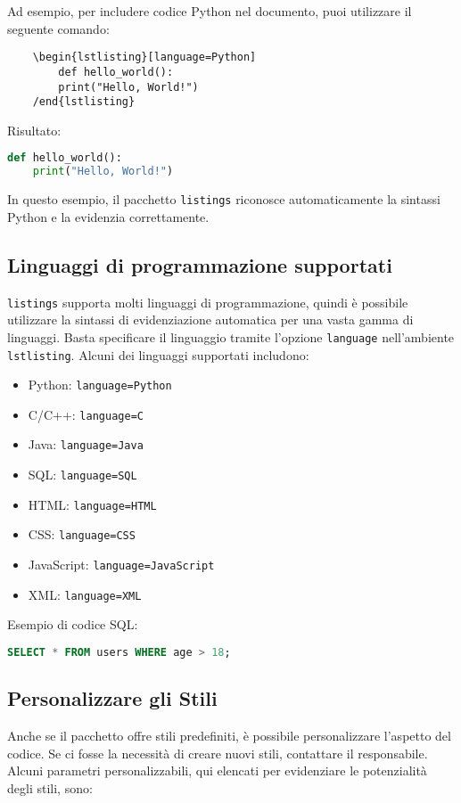 Ad esempio, per includere codice Python nel documento, puoi utilizzare il seguente comando:

\begin{lstlisting}
	\begin{lstlisting}[language=Python]
		def hello_world():
		print("Hello, World!")
	/end{lstlisting}
\end{lstlisting}

Risultato: 
\begin{lstlisting}[language=Python]
	def hello_world():
	print("Hello, World!")
\end{lstlisting}

In questo esempio, il pacchetto \texttt{listings} riconosce automaticamente la sintassi Python e la evidenzia correttamente.

\subsection{Linguaggi di programmazione supportati}
\texttt{listings} supporta molti linguaggi di programmazione, quindi è possibile utilizzare la sintassi di evidenziazione automatica per una vasta gamma di linguaggi. Basta specificare il linguaggio tramite l'opzione \texttt{language} nell'ambiente \texttt{lstlisting}. Alcuni dei linguaggi supportati includono:

\begin{itemize}
	\item Python: \texttt{language=Python}
	\item C/C++: \texttt{language=C}
	\item Java: \texttt{language=Java}
	\item SQL: \texttt{language=SQL}
	\item HTML: \texttt{language=HTML}
	\item CSS: \texttt{language=CSS}
	\item JavaScript: \texttt{language=JavaScript}
	\item XML: \texttt{language=XML}
\end{itemize}

Esempio di codice SQL:

\begin{lstlisting}[language=SQL]
	SELECT * FROM users WHERE age > 18;
\end{lstlisting}

\subsection{Personalizzare gli Stili}
Anche se il pacchetto offre stili predefiniti, è possibile personalizzare l'aspetto del codice. Se ci fosse la necessità di creare nuovi stili, contattare il responsabile. Alcuni parametri personalizzabili, qui elencati per evidenziare le potenzialità degli stili, sono:

